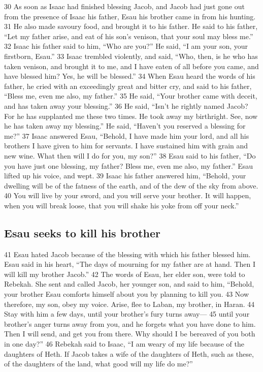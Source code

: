 {30} As soon as Isaac had finished blessing Jacob, and Jacob had just
gone out from the presence of Isaac his father, Esau his brother came in
from his hunting. {31} He also made savoury food, and brought it to his
father. He said to his father, ``Let my father arise, and eat of his
son's venison, that your soul may bless me.'' {32} Isaac his father said
to him, ``Who are you?'' He said, ``I am your son, your firstborn,
Esau.'' {33} Isaac trembled violently, and said, ``Who, then, is he who
has taken venison, and brought it to me, and I have eaten of all before
you came, and have blessed him? Yes, he will be blessed.'' {34} When
Esau heard the words of his father, he cried with an exceedingly great
and bitter cry, and said to his father, ``Bless me, even me also, my
father.'' {35} He said, ``Your brother came with deceit, and has taken
away your blessing.'' {36} He said, ``Isn't he rightly named Jacob? For
he has supplanted me these two times. He took away my birthright. See,
now he has taken away my blessing.'' He said, ``Haven't you reserved a
blessing for me?'' {37} Isaac answered Esau, ``Behold, I have made him
your lord, and all his brothers I have given to him for servants. I have
sustained him with grain and new wine. What then will I do for you, my
son?'' {38} Esau said to his father, ``Do you have just one blessing, my
father? Bless me, even me also, my father.'' Esau lifted up his voice,
and wept. {39} Isaac his father answered him, ``Behold, your dwelling
will be of the fatness of the earth, and of the dew of the sky from
above. {40} You will live by your sword, and you will serve your
brother. It will happen, when you will break loose, that you will shake
his yoke from off your neck.''

\hypertarget{esau-seeks-to-kill-his-brother}{%
\subsection{Esau seeks to kill his
brother}\label{esau-seeks-to-kill-his-brother}}

{41} Esau hated Jacob because of the blessing with which his father
blessed him. Esau said in his heart, ``The days of mourning for my
father are at hand. Then I will kill my brother Jacob.'' {42} The words
of Esau, her elder son, were told to Rebekah. She sent and called Jacob,
her younger son, and said to him, ``Behold, your brother Esau comforts
himself about you by planning to kill you. {43} Now therefore, my son,
obey my voice. Arise, flee to Laban, my brother, in Haran. {44} Stay
with him a few days, until your brother's fury turns away--- {45} until
your brother's anger turns away from you, and he forgets what you have
done to him. Then I will send, and get you from there. Why should I be
bereaved of you both in one day?'' {46} Rebekah said to Isaac, ``I am
weary of my life because of the daughters of Heth. If Jacob takes a wife
of the daughters of Heth, such as these, of the daughters of the land,
what good will my life do me?''

